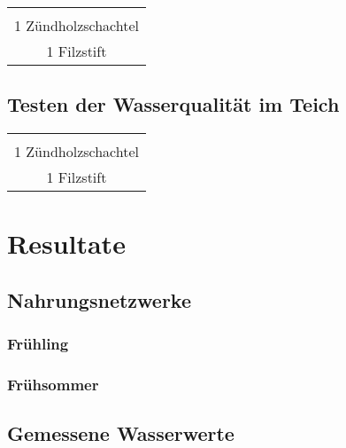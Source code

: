 \documentclass{article}
\begin{document}
    
        \begin{table}[h!]
        \centering
        \begin{tabular}{|c|} 
         \hline
         \\
         1 Zündholzschachtel \\
         1 Filzstift \\[1ex]
         \hline
        \end{tabular}
        \label{Tiere}
        \end{table}
        
    \subsection{Testen der Wasserqualität im Teich}
    
        \begin{table}[h!]
        \centering
        \begin{tabular}{|c|} 
         \hline
         \\
         1 Zündholzschachtel \\
         1 Filzstift \\[1ex]
         \hline
        \end{tabular}
        \label{Praktikum1}
        \end{table}

    

\section{Resultate}

    \subsection{Nahrungsnetzwerke}
        
    
        \subsubsection{Frühling}
        
        \subsubsection{Frühsommer}
        
    \subsection{Gemessene Wasserwerte}
\end{document}
